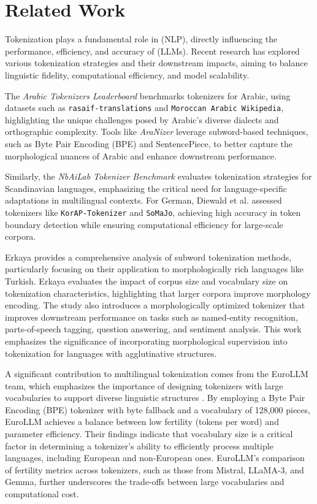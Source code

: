 \section{Related Work}

Tokenization plays a fundamental role in (NLP), directly influencing the performance, efficiency, and accuracy of (LLMs). Recent research has explored various tokenization strategies and their downstream impacts, aiming to balance linguistic fidelity, computational efficiency, and model scalability.

The \textit{Arabic Tokenizers Leaderboard} \cite{rashad_arabic_nodate} benchmarks tokenizers for Arabic, using datasets such as \texttt{rasaif-translations} and \texttt{Moroccan Arabic Wikipedia}, highlighting the unique challenges posed by Arabic's diverse dialects and orthographic complexity. Tools like \textit{AraNizer} \cite{koubaa_githubcomriotu-labaranizer_2024} leverage subword-based techniques, such as Byte Pair Encoding (BPE) and SentencePiece, to better capture the morphological nuances of Arabic and enhance downstream performance.

Similarly, the \textit{NbAiLab Tokenizer Benchmark} \cite{rosa_nbailabtokenizer-benchmark_2024} evaluates tokenization strategies for Scandinavian languages, emphasizing the critical need for language-specific adaptations in multilingual contexts. For German, Diewald et al. \cite{diewald_tokenizing_2022} assessed tokenizers like \texttt{KorAP-Tokenizer} and \texttt{SoMaJo}, achieving high accuracy in token boundary detection while ensuring computational efficiency for large-scale corpora.

Erkaya \cite{erkaya_analysis_2023} provides a comprehensive analysis of subword tokenization methods, particularly focusing on their application to morphologically rich languages like Turkish. Erkaya evaluates the impact of corpus size and vocabulary size on tokenization characteristics, highlighting that larger corpora improve morphology encoding. The study also introduces a morphologically optimized tokenizer that improves downstream performance on tasks such as named-entity recognition, parts-of-speech tagging, question answering, and sentiment analysis. This work emphasizes the significance of incorporating morphological supervision into tokenization for languages with agglutinative structures.

A significant contribution to multilingual tokenization comes from the EuroLLM team, which emphasizes the importance of designing tokenizers with large vocabularies to support diverse linguistic structures \cite{martins_eurollm_2024}. By employing a Byte Pair Encoding (BPE) tokenizer with byte fallback and a vocabulary of 128,000 pieces, EuroLLM achieves a balance between low fertility (tokens per word) and parameter efficiency. Their findings indicate that vocabulary size is a critical factor in determining a tokenizer’s ability to efficiently process multiple languages, including European and non-European ones. EuroLLM's comparison of fertility metrics across tokenizers, such as those from Mistral, LLaMA-3, and Gemma, further underscores the trade-offs between large vocabularies and computational cost.

